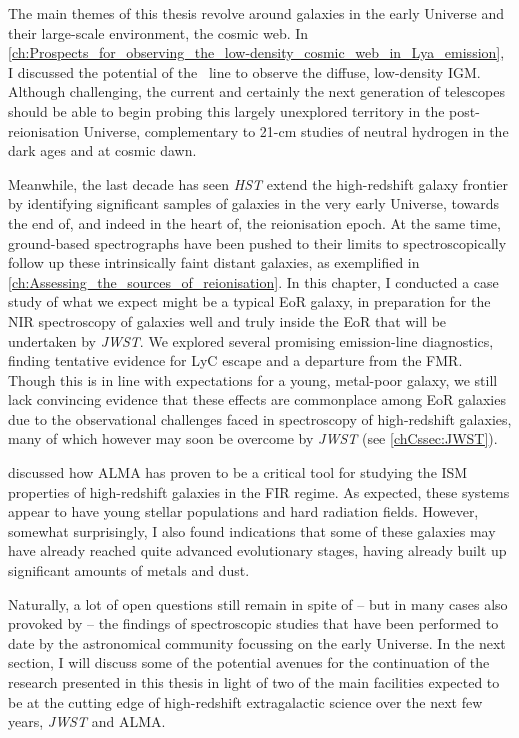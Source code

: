 The main themes of this thesis revolve around galaxies in the early Universe and their large-scale environment, the cosmic web. In \cref{ch:Prospects_for_observing_the_low-density_cosmic_web_in_Lya_emission}, I discussed the potential of the \lya\ line to observe the diffuse, low-density IGM. Although challenging, the current and certainly the next generation of telescopes should be able to begin probing this largely unexplored territory in the post-reionisation Universe, complementary to 21-cm studies of neutral hydrogen in the dark ages and at cosmic dawn.

Meanwhile, the last decade has seen \textit{HST} extend the high-redshift galaxy frontier by identifying significant samples of galaxies in the very early Universe, towards the end of, and indeed in the heart of, the reionisation epoch. At the same time, ground-based spectrographs have been pushed to their limits to spectroscopically follow up these intrinsically faint distant galaxies, as exemplified in \cref{ch:Assessing_the_sources_of_reionisation}. In this chapter, I conducted a case study of what we expect might be a typical EoR galaxy, in preparation for the NIR spectroscopy of galaxies well and truly inside the EoR that will be undertaken by \textit{JWST}. We explored several promising emission-line diagnostics, finding tentative evidence for LyC escape and a departure from the FMR. Though this is in line with expectations for a young, metal-poor galaxy, we still lack convincing evidence that these effects are commonplace among EoR galaxies due to the observational challenges faced in spectroscopy of high-redshift galaxies, many of which however may soon be overcome by \textit{JWST} (see \cref{chCssec:JWST}).

 discussed how ALMA has proven to be a critical tool for studying the ISM properties of high-redshift galaxies in the FIR regime. As expected, these systems appear to have young stellar populations and hard radiation fields. However, somewhat surprisingly, I also found indications that some of these galaxies may have already reached quite advanced evolutionary stages, having already built up significant amounts of metals and dust.

Naturally, a lot of open questions still remain in spite of -- but in many cases also provoked by -- the findings of spectroscopic studies that have been performed to date by the astronomical community focussing on the early Universe. In the next section, I will discuss some of the potential avenues for the continuation of the research presented in this thesis in light of two of the main facilities expected to be at the cutting edge of high-redshift extragalactic science over the next few years, \textit{JWST} and ALMA.


